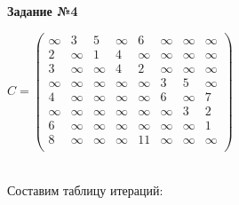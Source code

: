 \documentclass{article}
\begin{document}
\newpage
\begin{center}
	\textbf{Задание №4}
\end{center}
\hspace{10mm}
\begin{center}
    $C = 
    \begin{pmatrix}
		\infty & 3      & 5      & \infty & 6        & \infty & \infty & \infty \\
		2      & \infty & 1      & 4      & \infty   & \infty & \infty & \infty \\
		3      & \infty      & \infty & 4      & 2 & \infty      & \infty & \infty \\
		\infty & \infty & \infty      & \infty & \infty & 3 & 5      & \infty \\
		4      & \infty & \infty & \infty & \infty & 6      & \infty & 7      \\
		\infty & \infty & \infty & \infty & \infty      & \infty & 3      & 2      \\
		6      & \infty & \infty & \infty & \infty & \infty      & \infty & 1      \\
		8      & \infty & \infty & \infty & 11     & \infty & \infty & \infty \\
	\end{pmatrix}$
\end{center}
\vspace{5mm}
\par
\\
\hspace{5mm}
Составим таблицу итераций:
\\
\end{document}
